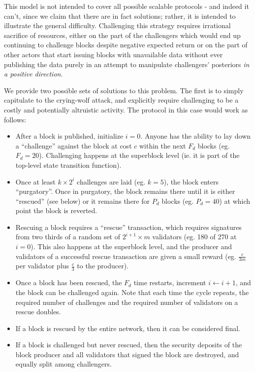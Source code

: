 \documentclass[11pt,a4paper]{report}
\theoremstyle{plain}
\theoremstyle{definition}
\theoremstyle{remark}
\begin{document}
This model is not intended to cover all possible scalable protocols - and indeed it can't, since we claim that there are in fact solutions; rather, it is intended to illustrate the general difficulty. Challenging this strategy requires irrational sacrifice of resources, either on the part of the challengers which would end up continuing to challenge blocks despite negative expected return or on the part of other actors that start issuing blocks with unavailable data without ever publishing the data purely in an attempt to manipulate challengers' posteriors \emph{in a positive direction}.

We provide two possible sets of solutions to this problem. The first is to simply capitulate to the crying-wolf attack, and explicitly require challenging to be a costly and potentially altruistic activity. The protocol in this case would work as follows:

\begin{itemize}
\item
After a block is published, initialize $i = 0$. Anyone has the ability to lay down a ``challenge'' against the block at cost $c$ within the next $F_d$ blocks (eg. $F_d = 20$). Challenging happens at the superblock level (ie. it is part of the top-level state transition function).
\item
Once at least $k \times  2^i$ challenges are laid (eg. $k = 5$), the block enters ``purgatory''. Once in purgatory, the block remains there until it is either ``rescued'' (see below) or it remains there for $P_d$ blocks (eg. $P_d = 40$) at which point the block is reverted.
\item
Rescuing a block requires a ``rescue'' transaction, which requires signatures from two thirds of a random set of $2^{i+1} \times  m$ validators (eg. 180 of 270 at $i = 0$). This also happens at the superblock level, and the producer and validators of a successful rescue transaction are given a small reward (eg. $\frac{c}{3m}$ per validator plus $\frac{c}{3}$ to the producer).
\item
Once a block has been rescued, the $F_d$ time restarts, increment $i \leftarrow i + 1$, and the block can be challenged again. Note that each time the cycle repeats, the required number of challenges and the required number of validators on a rescue doubles.
\item
If a block is rescued by the entire network, then it can be considered final.
\item
If a block is challenged but never rescued, then the security deposits of the block producer and all validators that signed the block are destroyed, and equally split among challengers.
\end{itemize}
\end{document}
